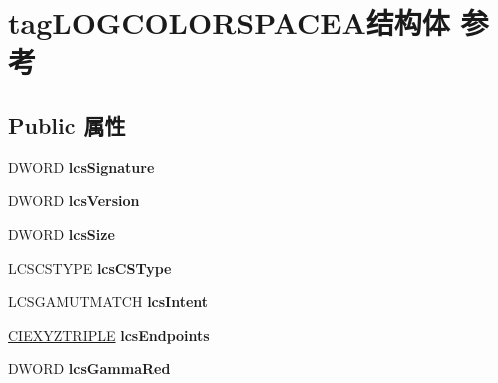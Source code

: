 \hypertarget{structtag_l_o_g_c_o_l_o_r_s_p_a_c_e_a}{}\section{tag\+L\+O\+G\+C\+O\+L\+O\+R\+S\+P\+A\+C\+E\+A结构体 参考}
\label{structtag_l_o_g_c_o_l_o_r_s_p_a_c_e_a}
\subsection*{Public 属性}
\begin{DoxyCompactItemize}
\item 
\mbox{\label{structtag_l_o_g_c_o_l_o_r_s_p_a_c_e_a_af3a86aebcccbd21176d99c959b38baa1}} 
D\+W\+O\+RD {\bfseries lcs\+Signature}
\item 
\mbox{\label{structtag_l_o_g_c_o_l_o_r_s_p_a_c_e_a_a54aff05e312e6ff1da2e23eaa491223f}} 
D\+W\+O\+RD {\bfseries lcs\+Version}
\item 
\mbox{\label{structtag_l_o_g_c_o_l_o_r_s_p_a_c_e_a_a47bee672635cff44aac30ba4239a4d45}} 
D\+W\+O\+RD {\bfseries lcs\+Size}
\item 
\mbox{\label{structtag_l_o_g_c_o_l_o_r_s_p_a_c_e_a_aa35e7cd5cd8ef95e5efdadd16192f428}} 
L\+C\+S\+C\+S\+T\+Y\+PE {\bfseries lcs\+C\+S\+Type}
\item 
\mbox{\label{structtag_l_o_g_c_o_l_o_r_s_p_a_c_e_a_a01ac6a7de8cab14b64cd2fa496d5c495}} 
L\+C\+S\+G\+A\+M\+U\+T\+M\+A\+T\+CH {\bfseries lcs\+Intent}
\item 
\mbox{\label{structtag_l_o_g_c_o_l_o_r_s_p_a_c_e_a_a189f7082bec152b5fbd535b17d53092a}} 
\hyperlink{structtag_c_i_e_x_y_z_t_r_i_p_l_e}{C\+I\+E\+X\+Y\+Z\+T\+R\+I\+P\+LE} {\bfseries lcs\+Endpoints}
\item 
\mbox{\label{structtag_l_o_g_c_o_l_o_r_s_p_a_c_e_a_ab0d7311877294607951a297f894e3ee2}} 
D\+W\+O\+RD {\bfseries lcs\+Gamma\+Red}
\item 

\end{DoxyCompactItemize}
